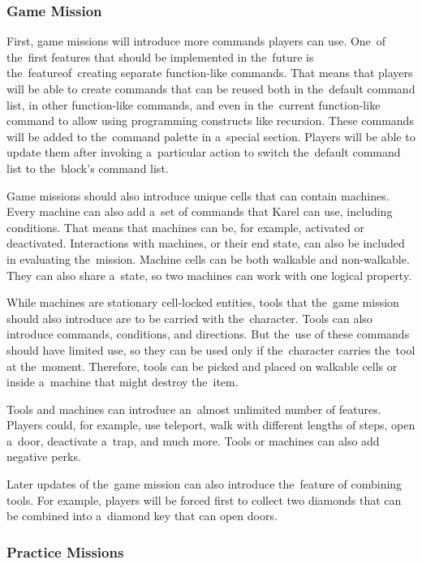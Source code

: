 \subsubsection{Game Mission}

First, game missions will introduce more commands players can use.
One~of the~first features that should be implemented in the~future is the~feature\linebreak{}of~creating separate function-like commands.
That means that players will be able to create commands that can be reused both in the~default command list, in other function-like commands, and even in the~current function-like command to allow using programming constructs like recursion.
These commands will be added to the~command palette in a~special section.
Players will be able to update them after invoking a~particular action to switch the~default command list to the~block's command list.

Game missions should also introduce unique cells that can contain machines.
Every machine can also add a~set of commands that Karel can use, including conditions.
That means that machines can be, for example, activated or deactivated.
Interactions with machines, or their end state, can also be included in evaluating the~mission.
Machine cells can be both walkable and non-walkable.
They can also share a~state, so two machines can work with one logical property.

While machines are stationary cell-locked entities, tools that the~game mission should also introduce are to be carried with the~character.
Tools can also introduce commands, conditions, and directions.
But the~use of these commands should have limited use, so they can be used only if the~character carries the~tool at the~moment.  
Therefore, tools can be picked and placed on walkable cells or inside a~machine that might destroy the~item.

Tools and machines can introduce an~almost unlimited number of features.
Players could, for example, use teleport, walk with different lengths of steps, open a~door, deactivate a~trap, and much more.
Tools or machines can also add negative perks.

Later updates of the~game mission can also introduce the~feature of combining tools.
For example, players will be forced first to collect two diamonds that can be combined into a~diamond key that can open doors.

\subsubsection{Practice Missions}

